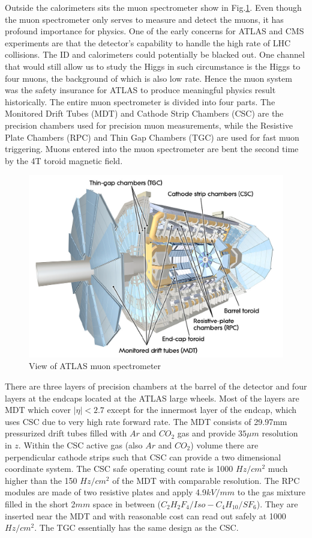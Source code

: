 \label{sec:detector-mu}
Outside the calorimeters sits the muon spectrometer show in Fig.\ref{fig:detector-mu}. Even though the muon spectrometer only serves to measure and detect the muons, it has profound importance for physics. One of the early concerns for ATLAS and CMS experiments are that the detector's capability to handle the high rate of LHC collisions. The ID and calorimeters could potentially be blacked out. One channel that would still allow us to study the Higgs in such circumstance is the Higgs to four muons, the background of which is also low rate. Hence the muon system was the safety insurance for ATLAS to produce meaningful physics result historically. The entire muon spectrometer is divided into four parts\cite{ATLASDetector}. The Monitored Drift Tubes (MDT) and Cathode Strip Chambers (CSC) are the precision chambers used for precision muon measurements, while the Resistive Plate Chambers (RPC) and Thin Gap Chambers (TGC) are used for fast muon triggering. Muons entered into the muon spectrometer are bent the second time by the 4T toroid magnetic field. 

\begin{figure}[htpb!]
\begin{center}
  \includegraphics[width=0.8\linewidth]{figures/detector/muon}
\caption{View of ATLAS muon spectrometer}
\label{fig:detector-mu}
\end{center}
\end{figure}


There are three layers of precision chambers at the barrel of the detector and four layers at the endcaps located at the ATLAS large wheels. Most of the layers are MDT which cover $|\eta|<2.7$ except for the innermost layer of the endcap, which uses CSC due to very high rate forward rate. The MDT consists of 29.97mm pressurized drift tubes filled with $Ar$ and $CO_2$ gas and provide $35\mu m$ resolution in $z$. Within the CSC active gas (also $Ar$ and $CO_2$) volume there are perpendicular cathode strips such that CSC can provide a two dimensional coordinate system. The CSC safe operating count rate is 1000 $Hz/cm^2$ much higher than the 150 $Hz/cm^2$ of the MDT with comparable resolution. The RPC modules are made of two resistive plates and apply 4.9$kV/mm$ to the gas mixture filled in the short 2$mm$ space in between ($C_2H_2F_4/Iso-C_4H_{10}/SF_6$). They are inserted near the MDT and with reasonable cost can read out safely at 1000 $Hz/cm^2$. The TGC essentially has the same design as the CSC.

